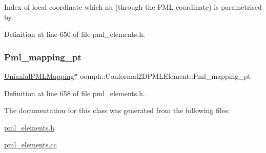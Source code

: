 Index of local coordinate which nu (through the P\+ML coordinate) is parametrised by. 



Definition at line 650 of file pml\+\_\+elements.\+h.

\mbox{\label{classoomph_1_1Conformal2DPMLElement_a8e9046efb4999dbb5840917a9568aad4}} 
\subsubsection{\texorpdfstring{Pml\+\_\+mapping\+\_\+pt}{Pml\_mapping\_pt}}
{\footnotesize\ttfamily \hyperlink{classoomph_1_1UniaxialPMLMapping}{Uniaxial\+P\+M\+L\+Mapping}$\ast$ oomph\+::\+Conformal2\+D\+P\+M\+L\+Element\+::\+Pml\+\_\+mapping\+\_\+pt\hspace{0.3cm}{\ttfamily [protected]}}



Definition at line 658 of file pml\+\_\+elements.\+h.



The documentation for this class was generated from the following files\+:\begin{DoxyCompactItemize}
\item 
\hyperlink{pml__elements_8h}{pml\+\_\+elements.\+h}\item 
\hyperlink{pml__elements_8cc}{pml\+\_\+elements.\+cc}\end{DoxyCompactItemize}
